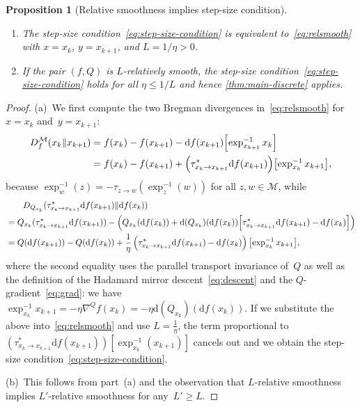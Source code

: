 \documentclass[11pt,letterpaper]{article}
\newtheorem{proposition}[theorem]{Proposition}\AddToHook{env/proposition/begin}{\crefalias{theorem}{proposition}}\crefname{proposition}{Proposition}{Propositions}
\numberwithin{equation}{section}
\newcommand{\diff}{\mathrm{d}}
\newcommand{\MM}{\mathcal{M}}
\begin{document}
\begin{proposition}[Relative smoothness implies step-size condition]\label{lem:relsmooth}~
\begin{enumerate}
    \item[(a)] The step-size condition~\eqref{eq:step-size-condition} is equivalent to~\eqref{eq:relsmooth} with $x = x_k$, $y = x_{k+1}$, and $L = 1/\eta > 0$.
    \item[(b)] If the pair $(f, Q)$ is $L$-relatively smooth, the step-size condition~\eqref{eq:step-size-condition} holds for all $\eta\leq 1/L$ and hence \cref{thm:main-discrete} applies.
\end{enumerate}
\end{proposition}
\begin{proof}
(a)~We first compute the two Bregman divergences in~\eqref{eq:relsmooth} for~$x = x_k$ and~$y = x_{k+1}$:
\begin{align*}
    D^\MM_{f}(x_k \Vert x_{k+1})
    &= f(x_k) - f(x_{k+1}) - \diff f(x_{k+1})\mleft[\exp_{x_{k+1}}^{-1} x_k\mright]\\
    &= f(x_k) - f(x_{k+1}) + \mleft(\tau^*_{x_k\to x_{k+1}}\diff f(x_{k+1})\mright)\mleft[\exp_{x_k}^{-1} x_{k+1}\mright],
\end{align*}
because $\exp^{-1}_w(z) = -\tau_{z\to w}(\exp_z^{-1}(w))$ for all $z,w\in\MM$, while
\begin{align*}
&\qquad D_{Q_{x_k}}(\tau^*_{x_k \to x_{k+1}}\diff f(x_{k+1}) \Vert \diff f(x_k)) \\
&= Q_{x_k}(\tau^*_{x_k \to x_{k+1}}\diff f(x_{k+1})) - \left( Q_{x_k}(\diff f(x_k)) + \diff (Q_{x_k})(\diff f(x_k))\mleft[ \tau^*_{x_k \to x_{k+1}}\diff f(x_{k+1}) - \diff f(x_k) \mright] \right) \\
&= Q(\diff f(x_{k+1})) - Q(\diff f(x_k)) + \frac1\eta \left( \tau^*_{x_k \to x_{k+1}}\diff f(x_{k+1}) - \diff f(x_k) \right)\mleft[ \exp_{x_k}^{-1} x_{k+1} \mright],
\end{align*}
where the second equality uses the parallel transport invariance of~$Q$ as well as the definition of the Hadamard mirror descent~\eqref{eq:descent} and the $Q$-gradient~\eqref{eq:grad}: we have $\exp_{x_k}^{-1} x_{k+1} = -\eta \nabla^Q f(x_k) = -\eta \diff (Q_{x_k})(\diff f(x_k))$.
If we substitute the above into~\eqref{eq:relsmooth} and use $L=\frac1\eta$, the term proportional to~$(\tau^*_{x_k\to x_{k+1}}\diff f(x_{k+1}))[\exp_{x_k}^{-1}(x_{k+1})]$ cancels out and we obtain the step-size condition~\eqref{eq:step-size-condition}.

(b)~This follows from part~(a) and the observation that $L$-relative smoothness implies $L'$-relative smoothness for any~$L' \ge L$.
\end{proof}
\end{document}
